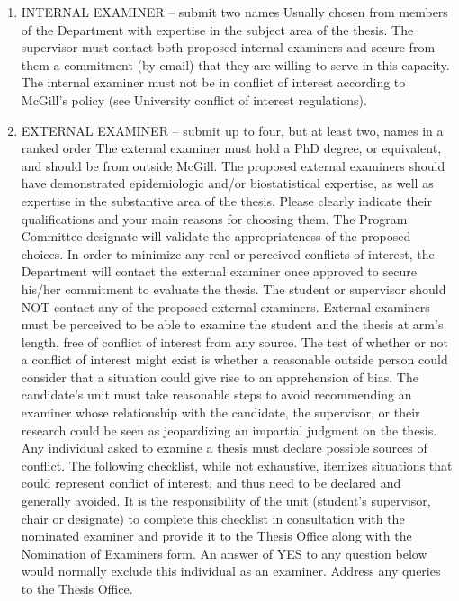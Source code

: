 \documentclass[
  openany]{book}
\begin{document}
\begin{enumerate}
\def\labelenumi{\arabic{enumi}.}
\item
  INTERNAL EXAMINER -- submit two names
  Usually chosen from members of the Department with expertise in the subject area of the thesis. The supervisor must contact both proposed internal examiners and secure from them a commitment (by email) that they are willing to serve in this capacity. The internal examiner must not be in conflict of interest according to McGill's policy (see University conflict of interest regulations).
\item
  EXTERNAL EXAMINER -- submit up to four, but at least two, names in a ranked order
  The external examiner must hold a PhD degree, or equivalent, and should be from outside McGill. The proposed external examiners should have demonstrated epidemiologic and/or biostatistical expertise, as well as expertise in the substantive area of the thesis. Please clearly indicate their qualifications and your main reasons for choosing them. The Program Committee designate will validate the appropriateness of the proposed choices. In order to minimize any real or perceived conflicts of interest, the Department will contact the external examiner once approved to secure his/her commitment to evaluate the thesis. The student or supervisor should NOT contact any of the proposed external examiners.
  External examiners must be perceived to be able to examine the student and the thesis at arm's length, free of conflict of interest from any source. The test of whether or not a conflict of interest might exist is whether a reasonable outside person could consider that a situation could give rise to an apprehension of bias. The candidate's unit must take reasonable steps to avoid recommending an examiner whose relationship with the candidate, the supervisor, or their research could be seen as jeopardizing an impartial judgment on the thesis. Any individual asked to examine a thesis must declare possible sources of conflict. The following checklist, while not exhaustive, itemizes situations that could represent conflict of interest, and thus need to be declared and generally avoided. It is the responsibility of the unit (student's supervisor, chair or designate) to complete this checklist in consultation with the nominated examiner and provide it to the Thesis Office along with the Nomination of Examiners form. An answer of YES to any question below would normally exclude this individual as an examiner. Address any queries to the Thesis Office.\\
\end{enumerate}
\end{document}
